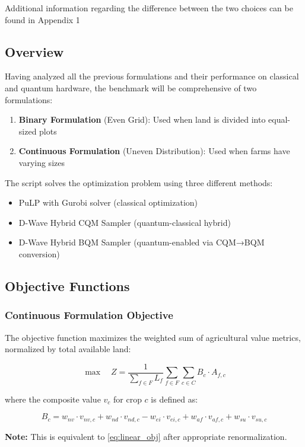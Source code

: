 \documentclass{article}
\begin{document}
Additional information regarding the difference between the two choices can be found in Appendix 1

\subsection{Overview}
Having analyzed all the previous formulations and their performance on classical and quantum hardware, the benchmark will be comprehensive of two formulations:

\begin{enumerate}
    \item \textbf{Binary Formulation} (Even Grid): Used when land is divided into equal-sized plots
    \item \textbf{Continuous Formulation} (Uneven Distribution): Used when farms have varying sizes
\end{enumerate}


The script solves the optimization problem using three different methods:
\begin{itemize}
    \item PuLP with Gurobi solver (classical optimization)
    \item D-Wave Hybrid CQM Sampler (quantum-classical hybrid)
    \item D-Wave Hybrid BQM Sampler (quantum-enabled via CQM→BQM conversion)
\end{itemize}



\subsection{Objective Functions}

\subsubsection{Continuous Formulation Objective}

The objective function maximizes the weighted sum of agricultural value metrics, normalized by total available land:

$$\max \quad Z = \frac{1}{\sum_{f \in F} L_f} \sum_{f \in F} \sum_{c \in C} B_c \cdot A_{f,c}$$

where the composite value $v_c$ for crop $c$ is defined as:

$$B_c = w_{nv} \cdot v_{nv,c} + w_{nd} \cdot v_{nd,c} - w_{ei} \cdot v_{ei,c} + w_{af} \cdot v_{af,c} + w_{su} \cdot v_{su,c}$$

\textbf{Note:} This is equivalent to \ref{eq:linear_obj} after appropriate renormalization.
\end{document}
